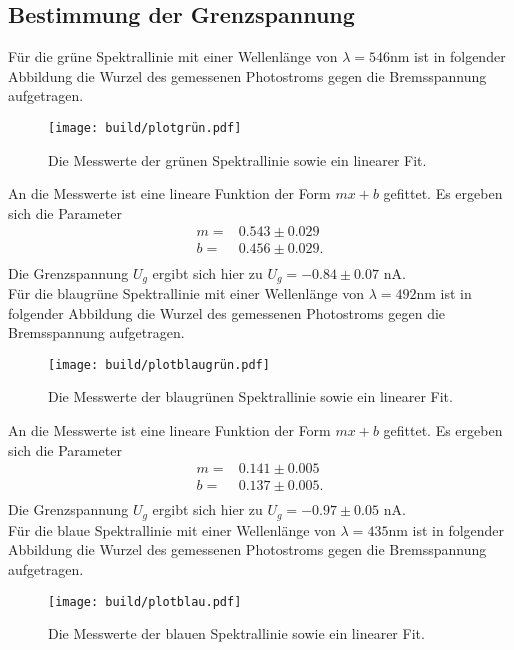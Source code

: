 \subsection{Bestimmung der Grenzspannung}
Für die grüne Spektrallinie mit einer Wellenlänge von $\lambda = 546 \si{\nano\meter}$
ist in folgender Abbildung die Wurzel des gemessenen Photostroms gegen die Bremsspannung
aufgetragen.
\begin{figure}[H]
  \centering
  \texttt{[image: build/plotgrün.pdf]}
  \label{fig:plotgrün}
  \caption{Die Messwerte der grünen Spektrallinie sowie ein linearer Fit.}
\end{figure}
\noindent
An die Messwerte ist eine lineare Funktion der Form $mx +b$ gefittet. Es ergeben
sich die Parameter
\begin{align*}
  m = & 0.543 \pm 0.029 \\
  b = & 0.456 \pm 0.029. \\
\end{align*}
Die Grenzspannung $U_g$ ergibt sich hier zu $ U_g = -0.84 \pm 0.07$ \si{\nano\ampere}. \\
\noindent
Für die blaugrüne Spektrallinie mit einer Wellenlänge von $\lambda = 492 \si{\nano\meter}$
ist in folgender Abbildung die Wurzel des gemessenen Photostroms gegen die Bremsspannung
aufgetragen.
\begin{figure}[H]
  \centering
  \texttt{[image: build/plotblaugrün.pdf]}
  \label{fig:plotblaugrün}
  \caption{Die Messwerte der blaugrünen Spektrallinie sowie ein linearer Fit.}
\end{figure}
\noindent
An die Messwerte ist eine lineare Funktion der Form $mx +b$ gefittet. Es ergeben
sich die Parameter
\begin{align*}
  m = & 0.141 \pm 0.005 \\
  b = & 0.137 \pm 0.005.\\
\end{align*}
Die Grenzspannung $U_g$ ergibt sich hier zu $ U_g = -0.97 \pm 0.05$ \si{\nano\ampere}. \\
\noindent
Für die blaue Spektrallinie mit einer Wellenlänge von $\lambda = 435 \si{\nano\meter}$ \cite{AP02}
ist in folgender Abbildung die Wurzel des gemessenen Photostroms gegen die Bremsspannung
aufgetragen.
\begin{figure}[H]
  \centering
  \texttt{[image: build/plotblau.pdf]}
  \label{fig:plotblau}
  \caption{Die Messwerte der blauen Spektrallinie sowie ein linearer Fit.}
\end{figure}
\noindent
